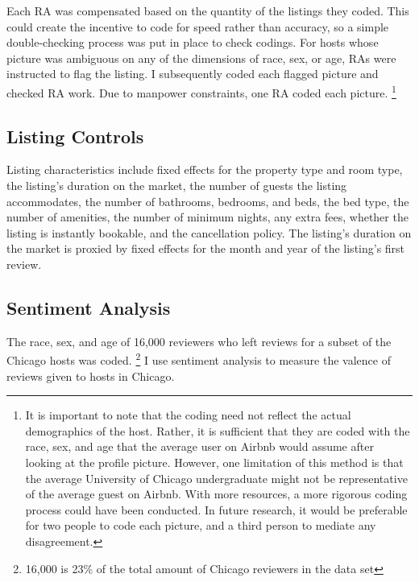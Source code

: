 Each RA was compensated based on the quantity of the listings they coded. This could create the incentive to code for speed rather than accuracy, so a simple double-checking process was put in place to check codings. For hosts whose picture was ambiguous on any of the dimensions of race, sex, or age, RAs were instructed to flag the listing. I subsequently coded each flagged picture and checked RA work. Due to manpower constraints, one RA coded each picture.%
	\footnote{It is important to note that the coding need not reflect the actual demographics of the host. Rather, it is sufficient that they are coded with the race, sex, and age that the average user on Airbnb would assume after looking at the profile picture. However, one limitation of this method is that the average University of Chicago undergraduate might not be representative of the average guest on Airbnb. With more resources, a more rigorous coding process could have been conducted. In future research, it would be preferable for two people to code each picture, and a third person to mediate any disagreement.}


\subsection*{Listing Controls}
Listing characteristics include fixed effects for the property type and room type, the listing's duration on the market, the number of guests the listing accommodates, the number of bathrooms, bedrooms, and beds, the bed type, the number of amenities, the number of minimum nights, any extra fees, whether the listing is instantly bookable, and the cancellation policy. The listing's duration on the market is proxied by fixed effects for the month and year of the listing's first review.

\subsection*{Sentiment Analysis}

The race, sex, and age of 16,000 reviewers who left reviews for a subset of the Chicago hosts was coded.%
	\footnote{16,000 is 23\% of the total amount of Chicago reviewers in the data set} 
I use sentiment analysis to measure the valence of reviews given to hosts in Chicago. 

